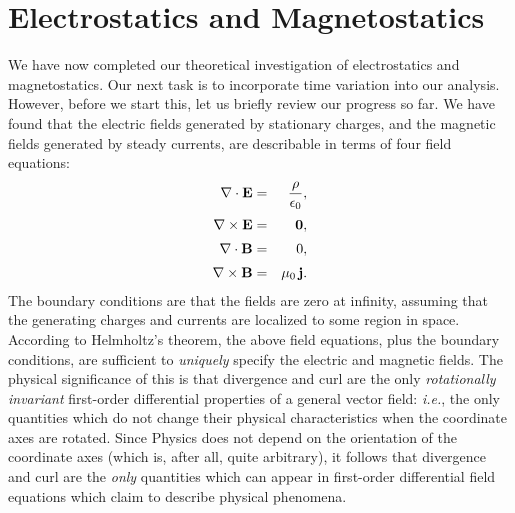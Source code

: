 \section{Electrostatics and Magnetostatics}
We have now completed our theoretical
investigation of electrostatics and magnetostatics. Our next task is to incorporate
time variation into our analysis.
However, before we start this, let us briefly review
our progress so far. We have found that the electric fields generated by stationary
charges, and the magnetic fields generated by steady currents, are describable
in terms of four field equations:
\begin{eqnarray}
\nabla\cdot {\bf E} &=& \frac{\rho}{\epsilon_0},\label{e3156a}\\[0.5ex]
\nabla\times{\bf E} &=& {\bf 0},\label{e3156b}\\[0.5ex]
\nabla\cdot{\bf B} &=& 0,\label{e3156c}\\[0.5ex]
\nabla\times{\bf B} &=& \mu_0 \,{\bf j}.\label{e3156d}
\end{eqnarray}
The boundary conditions are that the fields are zero at infinity, assuming that
the generating charges and currents are localized 
to some region in space. According to Helmholtz's theorem, the above field equations,
plus the boundary conditions, are sufficient to {\em uniquely}\/ specify the electric
and magnetic fields. The physical significance of this is that divergence
and curl are the only {\em rotationally invariant}\/ first-order differential properties
of a general vector field: {\em i.e.}, the only quantities which do not change their physical characteristics  when the
coordinate axes are rotated. Since Physics does not depend on the orientation of the coordinate axes
(which is, after all, quite arbitrary), it follows that divergence and curl are the {\em only}\/
quantities which can appear in  first-order differential field equations which claim to describe physical
phenomena.

